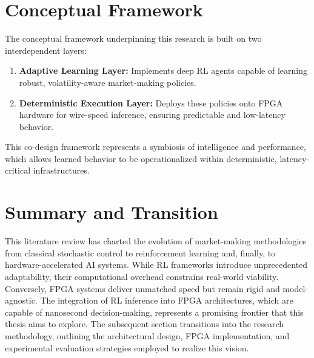 \section{Conceptual Framework}
\label{sec:framework}
The conceptual framework underpinning this research is built on two interdependent layers:
\begin{enumerate}
    \item \textbf{Adaptive Learning Layer:} Implements deep RL agents capable of learning robust, volatility-aware market-making policies.
    \item \textbf{Deterministic Execution Layer:} Deploys these policies onto FPGA hardware for wire-speed inference, ensuring predictable and low-latency behavior.
\end{enumerate}
This co-design framework represents a symbiosis of intelligence and performance, which allows learned behavior to be operationalized within deterministic, latency-critical infrastructures.

\section{Summary and Transition}
This literature review has charted the evolution of market-making methodologies from classical stochastic control to reinforcement learning and, finally, to hardware-accelerated AI systems. While RL frameworks introduce unprecedented adaptability, their computational overhead constrains real-world viability. Conversely, FPGA systems deliver unmatched speed but remain rigid and model-agnostic. The integration of RL inference into FPGA architectures, which are capable of nanosecond decision-making, represents a promising frontier that this thesis aims to explore. The subsequent section transitions into the research methodology, outlining the architectural design, FPGA implementation, and experimental evaluation strategies employed to realize this vision.
